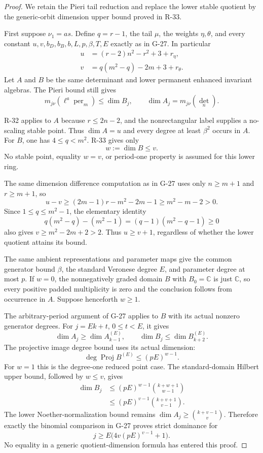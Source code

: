 \begin{proof}
We retain the Pieri tail reduction and replace the lower
stable quotient by the generic-orbit dimension upper bound
proved in R-33.

First suppose $\nu_1=as$. Define $q=r-1$, the tail $\mu$,
the weights $\eta,\theta$, and every constant $u,v,b_D,b_B,
b,L,p,\beta,T,E$ exactly as in G-27. In particular
\[
 \begin{aligned}
 u&=(r-2)n^2-r^2+3+r_\eta,\\
 v&=q(m^2-q)-2m+3+r_\theta.
 \end{aligned}
\]
Let $A$ and $B$ be the same determinant and lower permanent
enhanced invariant algebras. The Pieri bound still gives
\[
 m_{j\nu}(\ell^a\operatorname{per}_m)\le\dim B_j,
 \qquad \dim A_j=m_{j\nu}(\det_n).
\]

R-32 applies to $A$ because $r\le2n-2$, and the
nonrectangular label supplies a no-scaling stable point.
Thus $\dim A=u$ and every degree at least $\beta^2$ occurs
in $A$. For $B$, one has $4\le q<m^2$. R-33 gives only
\[
                         w:=\dim B\le v.
\]
No stable point, equality $w=v$, or period-one property is
assumed for this lower ring.

The same dimension difference computation as in G-27 uses
only $n\ge m+1$ and $r\ge m+1$, so
\[
 u-v\ge(2m-1)r-m^2-2m-1\ge m^2-m-2>0.
\]
Since $1\le q\le m^2-1$, the elementary identity
\[
 q(m^2-q)-(m^2-1)=(q-1)(m^2-q-1)\ge0
\]
also gives $v\ge m^2-2m+2>2$. Thus $u\ge v+1$,
regardless of whether the lower quotient attains its bound.

The same ambient representations and parameter maps give
the common generator bound $\beta$, the standard Veronese
degree $E$, and parameter degree at most $p$. If $w=0$,
the nonnegatively graded domain $B$ with $B_0=\mathbb C$
is just $\mathbb C$, so every positive padded multiplicity
is zero and the conclusion follows from occurrence in $A$.
Suppose henceforth $w\ge1$.

The arbitrary-period argument of G-27 applies to $B$ with
its actual nonzero generator degrees. For $j=Ek+t$,
$0\le t<E$, it gives
\[
 \dim A_j\ge\dim A^{(E)}_{k-1},\qquad
 \dim B_j\le\dim B^{(E)}_{k+2}.
\]
The projective image degree bound uses its actual dimension:
\[
 \deg\operatorname{Proj}B^{(E)}\le(pE)^{w-1}.
\]
For $w=1$ this is the degree-one reduced point case. The
standard-domain Hilbert upper bound, followed by $w\le v$,
gives
\[
 \begin{aligned}
 \dim B_j
   &\le(pE)^{w-1}\binom{k+w+1}{w-1}\\
   &\le(pE)^{v-1}\binom{k+v+1}{v-1}.
 \end{aligned}
\]
The lower Noether-normalization bound remains
$\dim A_j\ge\binom{k+v-1}{v}$. Therefore exactly the
binomial comparison in G-27 proves strict dominance for
\[
                    j\ge E\bigl(4v(pE)^{v-1}+1\bigr).
\]
No equality in a generic quotient-dimension formula has
entered this proof.


\end{proof}
